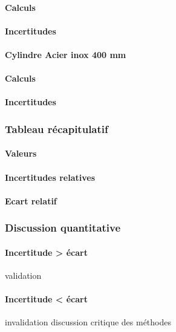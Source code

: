 \paragraph{Calculs}
\paragraph{Incertitudes}

\paragraph{\large Cylindre Acier inox 400 mm}
\paragraph{Calculs}
\paragraph{Incertitudes}

\newpage

\subsubsection{\large Tableau récapitulatif}
\paragraph{Valeurs}
\paragraph{Incertitudes relatives}
\paragraph{Ecart relatif}

\subsubsection{\large Discussion quantitative}
\paragraph{Incertitude > écart}
validation
\paragraph{Incertitude < écart}
invalidation
discussion critique des méthodes